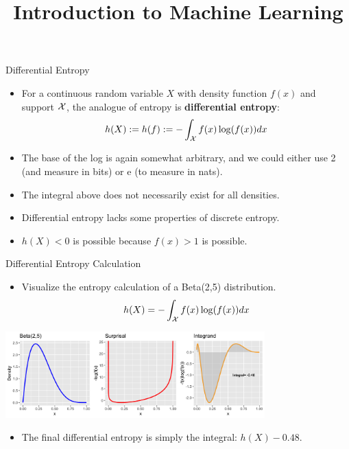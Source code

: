 \documentclass[11pt,compress,t,notes=noshow, xcolor=table]{beamer}
\title{Introduction to Machine Learning}
\date{}
\begin{document}

\begin{vbframe}{Differential Entropy} 
  \begin{itemize}
    \item For a continuous random variable $X$ with density function $f(x)$ and support $\mathcal{X}$, the analogue of entropy is \textbf{differential entropy}:
    $$ h(X) := h(f) := - \int_{\mathcal{X}} f(x) \log(f(x)) dx $$
    \item The base of the log is again somewhat arbitrary, and we could either use 2 (and measure in bits) or e (to measure in nats).
    \item The integral above does not necessarily exist for all densities.
    \item Differential entropy lacks some properties of discrete entropy.
    \item $h(X) < 0$ is possible because $f(x) > 1$ is possible.
    \end{itemize}
\end{vbframe}

\begin{vbframe}{Differential Entropy Calculation} 
  \begin{itemize}
    \item Visualize the entropy calculation of a Beta(2,5) distribution.
    $$ h(X) =- \int_{\mathcal{X}} f(x) \log(f(x)) dx $$
    \end{itemize}
    
    \begin{center}
    \includegraphics[width = 10cm ]{figure/beta_entropy.png}
    \end{center}
    
  \begin{itemize}
    \item The final differential entropy is simply the integral: $h(X)-0.48$.
    \end{itemize}    
    
\end{vbframe}
\end{document}
